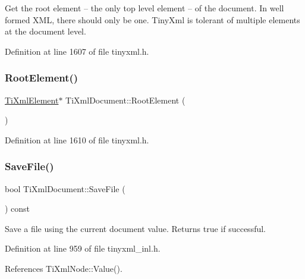 Get the root element -- the only top level element -- of the document. In well formed X\+ML, there should only be one. Tiny\+Xml is tolerant of multiple elements at the document level. 

Definition at line 1607 of file tinyxml.\+h.

\hypertarget{class_ti_xml_document_a0b43e762a23f938b06651bc90b8a1013}{}\label{class_ti_xml_document_a0b43e762a23f938b06651bc90b8a1013} 
\subsubsection{\texorpdfstring{Root\+Element()}{RootElement()}\hspace{0.1cm}{\footnotesize\ttfamily [2/2]}}
{\footnotesize\ttfamily \hyperlink{class_ti_xml_element}{Ti\+Xml\+Element}$\ast$ Ti\+Xml\+Document\+::\+Root\+Element (\begin{DoxyParamCaption}{ }\end{DoxyParamCaption})\hspace{0.3cm}{\ttfamily [inline]}}



Definition at line 1610 of file tinyxml.\+h.

\hypertarget{class_ti_xml_document_ab63b96a6af5a467e289c7c75202edad9}{}\label{class_ti_xml_document_ab63b96a6af5a467e289c7c75202edad9} 
\subsubsection{\texorpdfstring{Save\+File()}{SaveFile()}\hspace{0.1cm}{\footnotesize\ttfamily [1/4]}}
{\footnotesize\ttfamily bool Ti\+Xml\+Document\+::\+Save\+File (\begin{DoxyParamCaption}{ }\end{DoxyParamCaption}) const}



Save a file using the current document value. Returns true if successful. 



Definition at line 959 of file tinyxml\+\_\+inl.\+h.



References Ti\+Xml\+Node\+::\+Value().



